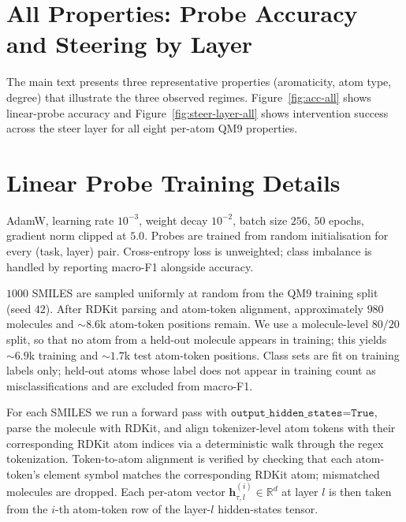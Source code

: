 \section{All Properties: Probe Accuracy and Steering by Layer}
\label{app:probe-all}
\label{app:steer-all}

The main text presents three representative properties (aromaticity, atom type, degree) that illustrate the three observed regimes. Figure~\ref{fig:acc-all} shows linear-probe accuracy and Figure~\ref{fig:steer-layer-all} shows intervention success across the steer layer for all eight per-atom QM9 properties.




\section{Linear Probe Training Details}
\label{app:training}


 AdamW, learning rate $10^{-3}$, weight decay $10^{-2}$, batch size $256$, $50$ epochs, gradient norm clipped at $5.0$. Probes are trained from random initialisation for every (task, layer) pair. Cross-entropy loss is unweighted; class imbalance is handled by reporting macro-F1 alongside accuracy.

 $1000$ SMILES are sampled uniformly at random from the QM9 training split (seed $42$). After RDKit parsing and atom-token alignment, approximately $980$ molecules and $\sim 8.6$k atom-token positions remain. We use a molecule-level $80/20$ split, so that no atom from a held-out molecule appears in training; this yields $\sim 6.9$k training and $\sim 1.7$k test atom-token positions. Class sets are fit on training labels only; held-out atoms whose label does not appear in training count as misclassifications and are excluded from macro-F1.

 For each SMILES we run a forward pass with $\texttt{output\_hidden\_states=True}$, parse the molecule with RDKit, and align tokenizer-level atom tokens with their corresponding RDKit atom indices via a deterministic walk through the regex tokenization. Token-to-atom alignment is verified by checking that each atom-token's element symbol matches the corresponding RDKit atom; mismatched molecules are dropped. Each per-atom vector $\mathbf{h}^{(i)}_{\tau, l} \in \mathbb{R}^{d}$ at layer $l$ is then taken from the $i$-th atom-token row of the layer-$l$ hidden-states tensor.

